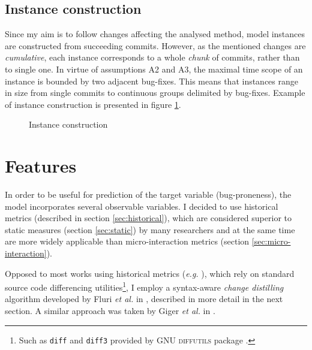 \documentclass{pracamgr}
\begin{document}
\subsection{Instance construction}
\label{sec:instance_construction}

Since my aim is to follow changes affecting the analysed method, model instances are constructed from succeeding commits. However, as the mentioned changes are \emph{cumulative}, each instance corresponds to a whole \emph{chunk} of commits, rather than to single one. In virtue of assumptions A2 and A3, the maximal time scope of an instance is bounded by two adjacent bug-fixes. This means that instances range in size from single commits to continuous groups delimited by bug-fixes. Example of instance construction is presented in figure \ref{fig:instance_construction}.

\begin{figure}[h]
\centering

\caption{Instance construction}
\label{fig:instance_construction}
\end{figure}

\section{Features}
\label{sec:features}
In order to be useful for prediction of the target variable (bug-proneness), the model incorporates several observable variables. I decided to use historical metrics (described in section \ref{sec:historical}), which are considered superior to static measures (section \ref{sec:static}) by many researchers \cite{merits, comparative, how_and_why} and at the same time are more widely applicable than micro-interaction metrics (section \ref{sec:micro-interaction}).

Opposed to most works using historical metrics (\textit{e.g.} \cite{systematic, merits, micro_interaction, comparative, how_and_why}), which rely on standard source code differencing utilities\footnote{Such as \texttt{diff} and \texttt{diff3} provided by \textsc{GNU diffutils} package \cite{diffutils}.}, I employ a syntax-aware \emph{change distilling} algorithm developed by Fluri \textit{et al.} in \cite{change_distilling}, described in more detail in the next section. A similar approach was taken by Giger \textit{et al.} in \cite{method-level}.
\end{document}
